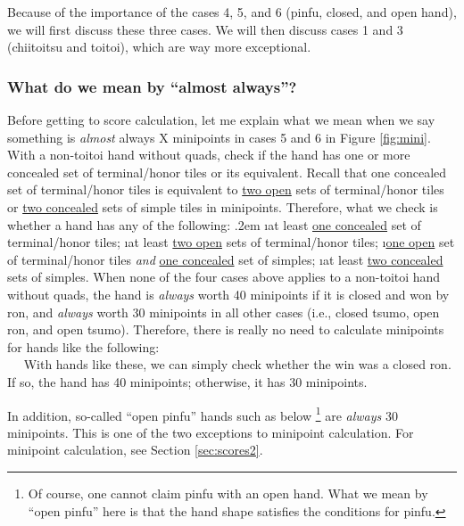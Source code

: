\bigskip
Because of the importance of the cases 4, 5, and 6 ({\jap pinfu}, closed, and open hand), we will first discuss these three cases. We will then discuss cases 1 and 3 ({\jap chiitoitsu} and {\jap toitoi}), which are way more exceptional. 

\subsubsection{What do we mean by ``almost always''?}
Before getting to score calculation, let me explain what we mean when we say something is \emph{almost} always X minipoints in cases 5 and 6 in Figure \ref{fig:mini}. 
With a non-{\jap toitoi} hand without quads, check if the hand has one or more concealed set of terminal/honor tiles or its equivalent. Recall that one concealed set of terminal/honor tiles is equivalent to \underline{two open} sets of terminal/honor tiles or \underline{two concealed} sets of simple tiles in minipoints. 
Therefore, what we check is whether a hand has any of the following:
\bi \itemsep.2em
\i at least \underline{one concealed} set of terminal/honor tiles;
\i at least \underline{two open} sets of terminal/honor tiles;
\i \underline{one open} set of terminal/honor tiles \emph{and} 
\underline{one concealed} set of simples;
\i at least \underline{two concealed} sets of simples.
\ei
When none of the four cases above applies to a non-{\jap toitoi} hand without quads, the hand is \emph{always} worth 40 minipoints if it is closed and won by {\jap ron}, and \emph{always} worth 30 minipoints in all other cases (i.e., closed {\jap tsumo}, open {\jap ron}, and open {\jap tsumo}). Therefore, there is really no need to calculate minipoints for hands like the following: 
\bp
{}~\zhong\rzhong\zhong\\
~\rdong\dong\dong~
\ep
With hands like these, we can simply check whether the win was a closed {\jap ron}. If so, the hand has 40 minipoints; otherwise, it has 30 minipoints.

\bigskip
In addition, so-called ``open {\jap pinfu}'' hands such as below \footnote{Of course, one cannot claim {\jap pinfu} with an open hand. What we mean by ``open {\jap pinfu}'' here is that the hand shape satisfies the conditions for {\jap pinfu}.} are \emph{always} 30 minipoints. This is one of the two exceptions to minipoint calculation. For minipoint calculation, see Section \ref{sec:scores2}.
\bp
{}~\\
\ep



